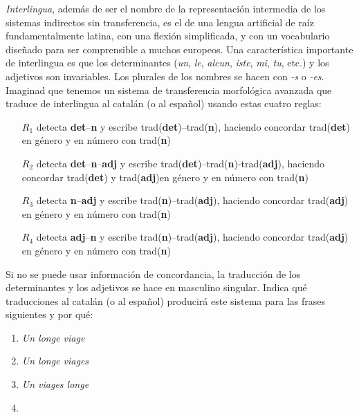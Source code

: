 
\item \emph{Interlingua}, además de ser el nombre de la representación intermedia de los sistemas indirectos sin transferencia, es el de una lengua artificial de raíz fundamentalmente latina, con una flexión simplificada, y con un vocabulario diseñado para ser comprensible a muchos europeos. Una característica importante de interlingua es que los determinantes (\emph{un}, \emph{le}, \emph{alcun}, \emph{iste}, \emph{mi}, \emph{tu}, etc.) y los adjetivos son invariables. Los plurales de los nombres se hacen con  \emph{-s} o \emph{-es}. Imaginad que tenemos un sistema de transferencia morfológica avanzada que traduce de interlingua al catalán (o al español) usando estas cuatro reglas: \begin{itemize} \item[$R_1$] detecta \textbf{det}--\textbf{n} y escribe \textsf{trad}(\textbf{det})--\textsf{trad}(\textbf{n}), haciendo concordar \textsf{trad}(\textbf{det}) en género y en número con \textsf{trad}(\textbf{n}) \item[$R_2$] detecta \textbf{det}--\textbf{n}--\textbf{adj} y escribe \textsf{trad}(\textbf{det})--\textsf{trad}(\textbf{n})-\textsf{trad}(\textbf{adj}), haciendo concordar \textsf{trad}(\textbf{det}) y \textsf{trad}(\textbf{adj})en género y en número con \textsf{trad}(\textbf{n}) \item[$R_3$] detecta \textbf{n}--\textbf{adj} y escribe \textsf{trad}(\textbf{n})--\textsf{trad}(\textbf{adj}), haciendo concordar \textsf{trad}(\textbf{adj}) en género y en número con \textsf{trad}(\textbf{n}) \item[$R_4$] detecta \textbf{adj}--\textbf{n} y escribe \textsf{trad}(\textbf{n})--\textsf{trad}(\textbf{adj}), haciendo concordar \textsf{trad}(\textbf{adj}) en género y en número con \textsf{trad}(\textbf{n}) \end{itemize} Si no se puede usar información de concordancia, la traducción de los determinantes y los adjetivos se hace en masculino singular. Indica qué traducciones al catalán (o al español) producirá este sistema para las frases siguientes y por qué: \begin{enumerate} \item \emph{Un longe viage} \item \emph{Un longe viages} \item \emph{Un viages longe} \item 
\end{enumerate}
